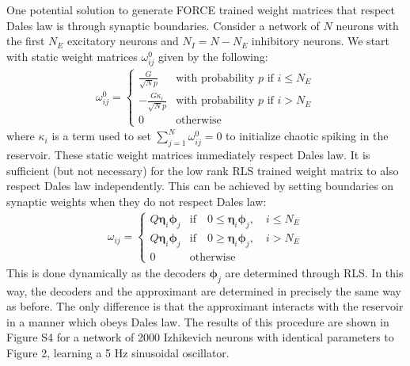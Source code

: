 \documentclass[11pt]{article} %
\begin{document}
One potential solution to generate FORCE trained weight matrices that respect Dales law is through synaptic boundaries.  Consider a network of $N$ neurons with the first $N_E$ excitatory neurons and $N_I = N - N_E$ inhibitory neurons.  We start with static weight matrices $\omega_{ij}^0$ given by the following:
\begin{eqnarray}
\omega_{ij}^0 = \begin{cases} \frac{G}{\sqrt{N}p}& \text{with probability $p$ if $i\leq N_E$}\\ -\frac{G\kappa_i}{\sqrt{N}p}& \text{with probability $p$ if $i>N_E$} \\ 0&\text{otherwise}     \end{cases} 
\end{eqnarray}
where $\kappa_i$ is a term used to set $\sum_{j=1}^N \omega_{ij}^0 = 0$ to initialize chaotic spiking in the reservoir.  These static weight matrices immediately respect Dales law.  It is sufficient (but not necessary) for the low rank RLS trained weight matrix to also respect Dales law independently.  This can be achieved by setting boundaries on synaptic weights when they do not respect Dales law: 
\begin{eqnarray}
\omega_{ij} = \begin{cases} Q \bm \eta_i \bm \phi_j & \text{if} \quad  0\leq \bm \eta_i \bm \phi_j,\quad  i\leq N_E   \\
Q\bm \eta_i \bm \phi_j & \text{if} \quad  0\geq \bm \eta_i \bm \phi_j,\quad  i> N_E   \\
0 & \text{otherwise}   \end{cases} 
\end{eqnarray}
This is done dynamically as the decoders $\bm \phi_j$ are determined through RLS.  In this way, the decoders and the approximant are determined in precisely the same way as before.   The only difference is that the approximant interacts with the reservoir in a manner which obeys Dales law.  The results of this procedure are shown in Figure S4 for a network of 2000 Izhikevich neurons with identical parameters to Figure 2, learning a 5 Hz sinusoidal oscillator. 
\end{document}
